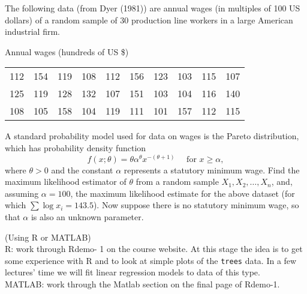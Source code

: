 \documentclass[answers]{exam}
\begin{document}
\begin{questions}
\question%
The following data (from Dyer (1981)) are annual wages (in multiples of 100 US dollars) of a random sample of 30 production line workers in a large American industrial firm. \begin{center} Annual wages (hundreds of US \$)\\ \begin{tabular}{llllllllll}
	\hline
	112 & 154 & 119 & 108 & 112 & 156 & 123 & 103 & 115 & 107 \\
	125 & 119 & 128 & 132 & 107 & 151 & 103 & 104 & 116 & 140 \\
	108 & 105 & 158 & 104 & 119 & 111 & 101 & 157 & 112 & 115 \\
	\hline
\end{tabular}\end{center}
\begin{subparts}
\subpart A standard probability model used for data on wages is the Pareto distribution, which has probability density function \[
	f(x ; \theta)=\theta \alpha^{\theta} x^{-(\theta+1)} \quad \text { for } x \geqslant \alpha,
\] where $\theta>0$ and the constant $\alpha$ represents a statutory minimum wage. Find the maximum likelihood estimator of $\theta$ from a random sample $X_{1}, X_{2}, \ldots, X_{n}$, and, assuming $\alpha=100$, the maximum likelihood estimate for the above dataset (for which $\sum \log x_{i}=143.5$).
\subpart Now suppose there is no statutory minimum wage, so that $\alpha$ is also an unknown parameter.
\end{subparts}



\question%
(Using R or MATLAB)\\
$\mathrm{R}$: work through Rdemo- 1 on the course website. At this stage the idea is to get some experience with $\mathrm{R}$ and to look at simple plots of the \texttt{trees} data. In a few lectures' time we will fit linear regression models to data of this type.\\
MATLAB: work through the Matlab section on the final page of Rdemo-1.

\end{questions}
\end{document}
